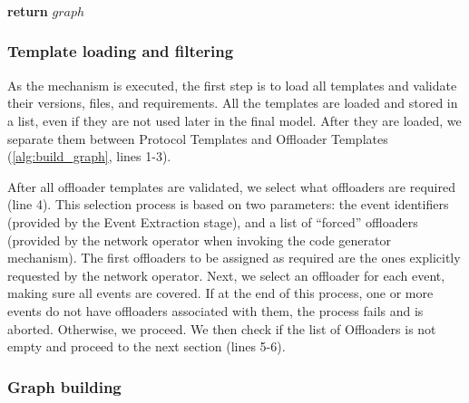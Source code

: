 \begin{algorithm}[htb]
     \\
    
    \vspace{1em}
            
     \\
     \\
     \\
     \\
    
    \vspace{1em}
            
    \textbf{return} $graph$  \\
\end{algorithm}


\subsubsection*{Template loading and filtering}

As the mechanism is executed, the first step is to load all templates and validate their versions, files, and requirements. All the templates are loaded and stored in a list, even if they are not used later in the final model. After they are loaded, we separate them between Protocol Templates and Offloader Templates (\autoref{alg:build_graph}, lines 1-3).

After all offloader templates are validated, we select what offloaders are required (line 4). This selection process is based on two parameters: the event identifiers (provided by the Event Extraction stage), and a list of ``forced'' offloaders (provided by the network operator when invoking the code generator mechanism). The first offloaders to be assigned as required are the ones explicitly requested by the network operator. Next, we select an offloader for each event, making sure all events are covered. If at the end of this process, one or more events do not have offloaders associated with them, the process fails and is aborted. Otherwise, we proceed. We then check if the list of Offloaders is not empty and proceed to the next section (lines 5-6).

\subsubsection*{Graph building}


